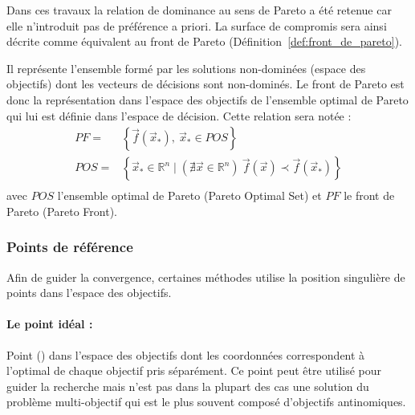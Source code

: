 
Dans ces travaux la relation de dominance au sens de Pareto a été retenue car
elle n’introduit pas de préférence a priori. La surface de compromis sera ainsi
décrite comme équivalent au front de Pareto (Définition~\ref{def:front_de_pareto}).


\begin{Def}\label{def:front_de_pareto}
Il représente l’ensemble formé par les solutions non-dominées (espace des objectifs)
dont les vecteurs de décisions sont non-dominés.
Le front de Pareto est donc la représentation dans l’espace des objectifs
de l’ensemble optimal de Pareto qui lui est définie dans l’espace de décision.
Cette relation sera notée :
\begin{equation}
  \begin{aligned}
    PF   =& \left\{ \vec{f}(\vec{x}_{*}), \  \vec{x}_{*} \in POS \right\} \\
    POS  =& \left\{ \vec{x}_{*} \in \mathbb{R}^{n} \mid (\nexists \vec{x} \in \mathbb{R}^{n}) \  \vec{f}(\vec{x}) \prec \vec{f}(\vec{x}_{*}) \right\} \\
  \end{aligned}
\end{equation}
avec $POS$ l’ensemble optimal de Pareto (Pareto Optimal Set) et $PF$ le front de Pareto
(Pareto Front).
\end{Def}


\subsubsection{Points de référence} %
\label{ssub:points_de_reference}
Afin de guider la convergence, certaines méthodes utilise la position singulière
de points dans l’espace des objectifs.
\paragraph{Le point idéal :} %
\label{par:le_point_idéal}
Point () dans l’espace des objectifs dont
les coordonnées correspondent à l’optimal de chaque objectif pris séparément. Ce point
peut être utilisé pour guider la recherche mais n’est pas dans la plupart des cas
une solution du problème multi-objectif qui est le plus souvent composé d’objectifs
antinomiques.

